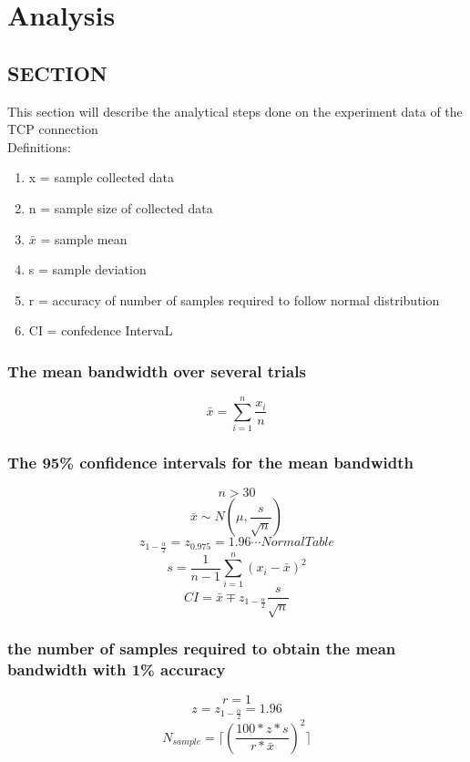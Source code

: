 \documentclass[aps,letterpaper,10pt]{revtex4}
\begin{document}
\section{Analysis}
    \subsection{SECTION}
This section will describe the analytical steps done on the experiment data of the TCP connection\\
Definitions:
    \begin{enumerate}
        \item x = sample collected data
        \item n = sample size of collected data
        \item $\bar{x}$ = sample mean 
        \item s = sample deviation 
        \item r = accuracy of number of samples required to follow normal distribution 
        \item CI = confedence IntervaL 
    \end{enumerate}
    \subsubsection{The mean bandwidth over several trials}
            \[
            \bar{x} = \sum_{i=1}^n{\frac{x_{i}}{n}}
            \]
        \subsubsection{The 95\% confidence intervals for the mean bandwidth}
            \[
            n > 30
            \]
            \[
            \bar{x} \sim N(\mu , \frac{s}{\sqrt{n}})
            \]
            \[
            z_{1-\frac{\alpha}{2}} = z_{0.975} = 1.96 \cdots Normal Table
            \]
            \[
            s = \frac{1}{n-1}\sum_{i=1}^n{(x_{i} - \bar{x})^2}
            \]
            \[
            CI = \bar{x} \mp z_{1-\frac{\alpha}{2}}\frac{s}{\sqrt{n}}
            \]
        \subsubsection{the number of samples required to obtain the mean bandwidth with 1\% accuracy}
            \[
            r = 1
            \]
            \[
            z = z_{1-\frac{\alpha}{2}} = 1.96
            \]
            \[
            N_{sample} = \lceil (\frac{100*z*s}{r*\bar{x}})^2 \rceil
            \]
\end{document}
